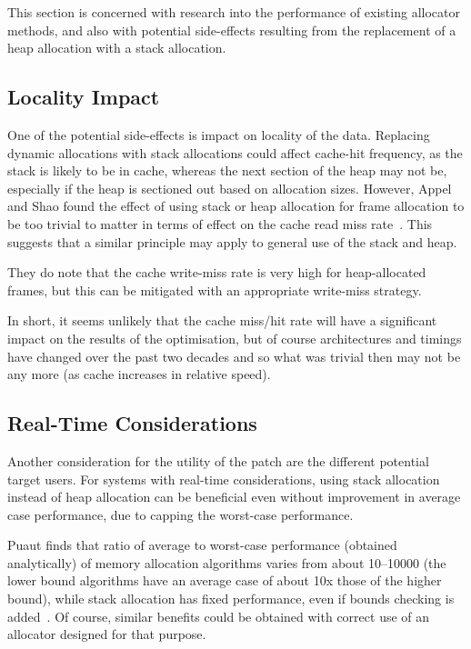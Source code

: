 This section is concerned with research into the performance of existing allocator methods, and also with potential side-effects resulting from the replacement of a heap allocation with a stack allocation.

\subsection{Locality Impact}

One of the potential side-effects is impact on locality of the data. Replacing dynamic allocations with stack allocations could affect cache-hit frequency, as the stack is likely to be in cache, whereas the next section of the heap may not be, especially if the heap is sectioned out based on allocation sizes. However, Appel and Shao found the effect of using stack or heap allocation for frame allocation to be too trivial to matter in terms of effect on the cache read miss rate~\cite{stackvheap}. This suggests that a similar principle may apply to general use of the stack and heap.

They do note that the cache write-miss rate is very high for heap-allocated frames, but this can be mitigated with an appropriate write-miss strategy.

In short, it seems unlikely that the cache miss/hit rate will have a significant impact on the results of the optimisation, but of course architectures and timings have changed over the past two decades and so what was trivial then may not be any more (as cache increases in relative speed).

\subsection{Real-Time Considerations}

Another consideration for the utility of the patch are the different potential target users. For systems with real-time considerations, using stack allocation instead of heap allocation can be beneficial even without improvement in average case performance, due to capping the worst-case performance.

Puaut finds that ratio of average to worst-case performance (obtained analytically) of memory allocation algorithms varies from about 10–10000 (the lower bound algorithms have an average case of about 10x those of the higher bound), while stack allocation has fixed performance, even if bounds checking is added~\cite{mallocperf}. Of course, similar benefits could be obtained with correct use of an allocator designed for that purpose.

